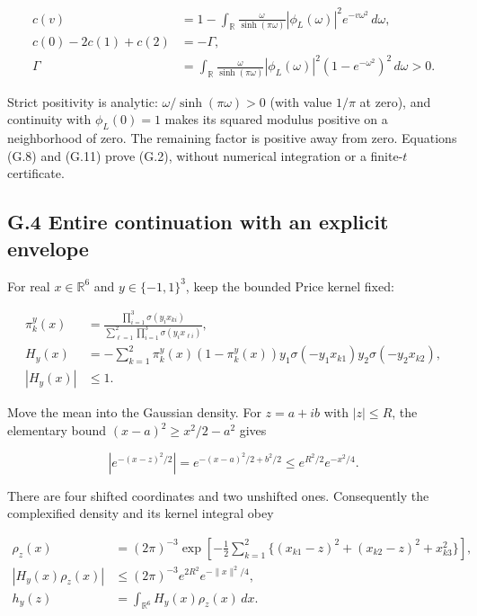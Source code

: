 \documentclass{article}
\begin{document}
\[
\begin{aligned}
c(v)&=1-\int_{\mathbb R}\frac{\omega}{\sinh(\pi\omega)}
|\phi_L(\omega)|^2e^{-v\omega^2}\,d\omega,\\
c(0)-2c(1)+c(2)&=-\Gamma,\\
\Gamma&=\int_{\mathbb R}\frac{\omega}{\sinh(\pi\omega)}
|\phi_L(\omega)|^2(1-e^{-\omega^2})^2\,d\omega>0.
\end{aligned}
\tag{G.11}
\]

Strict positivity is analytic: \(\omega/\sinh(\pi\omega)>0\) (with value
\(1/\pi\) at zero), and continuity with \(\phi_L(0)=1\) makes its
squared modulus positive on a neighborhood of zero. The remaining factor
is positive away from zero. Equations (G.8) and (G.11) prove (G.2),
without numerical integration or a finite-\(t\) certificate.

\subsection*{G.4 Entire continuation with an explicit
envelope}\label{g.4-entire-continuation-with-an-explicit-envelope}

For real \(x\in\mathbb R^6\) and \(y\in\{-1,1\}^3\), keep the bounded
Price kernel fixed:

\[
\begin{aligned}
\pi_k^y(x)&=\frac{\prod_{i=1}^3\sigma(y_ix_{ki})}
{\sum_{\ell=1}^2\prod_{i=1}^3\sigma(y_ix_{\ell i})},\\
H_y(x)&=-\sum_{k=1}^2\pi_k^y(x)(1-\pi_k^y(x))
y_1\sigma(-y_1x_{k1})y_2\sigma(-y_2x_{k2}),\\
|H_y(x)|&\le1.
\end{aligned}
\tag{G.12}
\]

Move the mean into the Gaussian density. For \(z=a+ib\) with
\(|z|\le R\), the elementary bound \((x-a)^2\ge x^2/2-a^2\) gives

\[
\left|e^{-(x-z)^2/2}\right|
=e^{-(x-a)^2/2+b^2/2}
\le e^{R^2/2}e^{-x^2/4}.
\tag{G.13}
\]

There are four shifted coordinates and two unshifted ones. Consequently
the complexified density and its kernel integral obey

\[
\begin{aligned}
\rho_z(x)&=(2\pi)^{-3}\exp\left[-\frac12\sum_{k=1}^2
\{(x_{k1}-z)^2+(x_{k2}-z)^2+x_{k3}^2\}\right],\\
|H_y(x)\rho_z(x)|&\le(2\pi)^{-3}e^{2R^2}e^{-\|x\|^2/4},\\
h_y(z)&=\int_{\mathbb R^6}H_y(x)\rho_z(x)\,dx.
\end{aligned}
\tag{G.14}
\]
\end{document}
